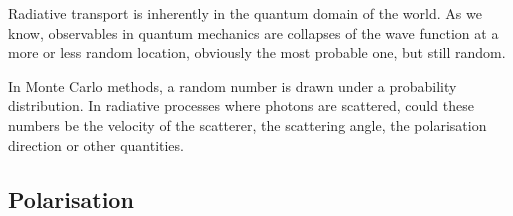 \documentclass[ignorenonframetext]{beamer}
\begin{document}
Radiative transport is inherently in the quantum domain of the world. As we know, observables in quantum mechanics are collapses of the wave function at a more or less random location, obviously the most probable one, but still random. 

In Monte Carlo methods, a random number is drawn under a probability distribution.  In radiative processes where photons are scattered, could these numbers be the velocity of the scatterer, the scattering angle, the polarisation direction or other quantities. 

\begin{frame}
    \section{Polarisation}
\end{frame}

\begin{frame}



%
%

    
\end{frame}
\end{document}
